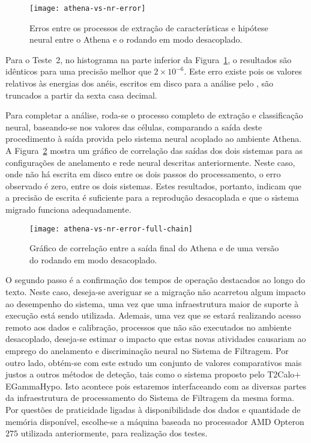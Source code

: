 \begin{figure}
\begin{center}
\texttt{[image: athena-vs-nr-error]}
\end{center}
\caption{Erros entre os processos de extração de características e hipótese
neural entre o Athena e o  rodando em modo desacoplado.}
\label{fig:athena-vs-nr}
\end{figure}

Para o Teste~2, no histograma na parte inferior da
Figura~\ref{fig:athena-vs-nr}, o resultados são idênticos para uma precisão
melhor que $2 \times 10^{-6}$. Este erro existe pois os valores relativos às
energias dos anéis, escritos em disco para a análise pelo ,
são truncados a partir da sexta casa decimal.

Para completar a análise, roda-se o processo completo de extração e
classificação neural, baseando-se nos valores das células, comparando a saída
deste procedimento à saída provida pelo sistema neural acoplado ao ambiente
Athena. A Figura~\ref{fig:athena-vs-nr-full} mostra um gráfico de correlação
das saídas dos dois sistemas para as configurações de anelamento e rede neural
descritas anteriormente. Neste caso, onde não há escrita em disco entre os
dois passos do processamento, o erro observado é zero, entre os dois
sistemas. Estes resultados, portanto, indicam que a precisão de escrita é
suficiente para a reprodução desacoplada e que o sistema migrado funciona
adequadamente.

\begin{figure}
\begin{center}
\texttt{[image: athena-vs-nr-error-full-chain]}
\end{center}
\caption{Gráfico de correlação entre a saída final do Athena e de uma versão do
 rodando em modo desacoplado.}
\label{fig:athena-vs-nr-full}
\end{figure}

O segundo passo é a confirmação dos tempos de operação destacados ao longo do
texto. Neste caso, deseja-se averiguar se a migração não acarretou algum
impacto ao desempenho do sistema, uma vez que uma infraestrutura maior de
suporte à execução está sendo utilizada. Ademais, uma vez que se estará
realizando acesso remoto aos dados e calibração, processos que não são
executados no ambiente desacoplado, deseja-se estimar o impacto que estas
novas atividades causariam ao emprego do anelamento e discriminação neural no
Sistema de Filtragem. Por outro lado, obtém-se com este estudo um conjunto de
valores comparativos mais justos a outros métodos de deteção, tais como o
sistema proposto pelo T2Calo$+$EGammaHypo. Isto acontece pois estaremos
interfaceando com as diversas partes da infraestrutura de processamento do
Sistema de Filtragem da mesma forma. Por questões de praticidade ligadas à
disponibilidade dos dados e quantidade de memória disponível, escolhe-se a
máquina baseada no processador AMD Opteron $275$ utilizada anteriormente, para
realização dos testes.

